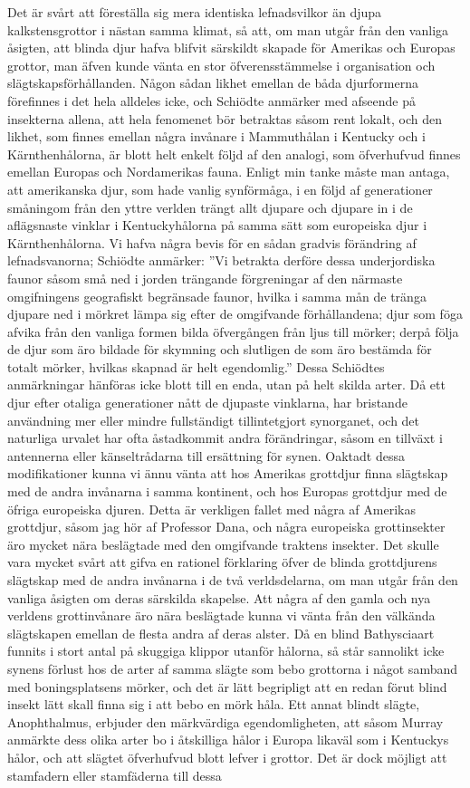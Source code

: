 Det är svårt att föreställa sig mera identiska lefnadsvilkor än djupa kalkstensgrottor i nästan samma klimat, så att, om man utgår från den vanliga åsigten, att blinda djur hafva blifvit särskildt skapade för Amerikas och Europas grottor, man äfven kunde vänta en stor öfverensstämmelse i organisation och slägtskapsförhållanden. Någon sådan likhet emellan de båda djurformerna förefinnes i det hela alldeles icke, och Schiödte anmärker med afseende på insekterna allena, att hela fenomenet bör betraktas såsom rent lokalt, och den likhet, som finnes emellan några invånare i Mammuthålan i Kentucky och i Kärnthenhålorna, är blott helt enkelt följd af den analogi, som öfverhufvud finnes emellan Europas och Nordamerikas fauna. Enligt min tanke måste man antaga, att amerikanska djur, som hade vanlig synförmåga, i en följd af generationer småningom från den yttre verlden trängt allt djupare och djupare in i de aflägsnaste vinklar i Kentuckyhålorna på samma sätt som europeiska djur i Kärnthenhålorna. Vi hafva några bevis för en sådan gradvis förändring af lefnadsvanorna; Schiödte anmärker: ”Vi betrakta derföre dessa underjordiska faunor såsom små ned i jorden trängande förgreningar af den närmaste omgifningens geografiskt begränsade faunor, hvilka i samma mån de tränga djupare ned i mörkret lämpa sig efter de omgifvande förhållandena; djur som föga afvika från den vanliga formen bilda öfvergången från ljus till mörker; derpå följa de djur som äro bildade för skymning och slutligen de som äro bestämda för totalt mörker, hvilkas skapnad är helt egendomlig.” Dessa Schiödtes anmärkningar hänföras icke blott till en enda, utan på helt skilda arter. Då ett djur efter otaliga generationer nått de djupaste vinklarna, har bristande användning mer eller mindre fullständigt tillintetgjort synorganet, och det naturliga urvalet har ofta åstadkommit andra förändringar, såsom en tillväxt i antennerna eller känseltrådarna till ersättning för synen. Oaktadt dessa modifikationer kunna vi ännu vänta att hos Amerikas grottdjur finna slägtskap med de andra invånarna i samma kontinent, och hos Europas grottdjur med de öfriga europeiska djuren. Detta är verkligen fallet med några af Amerikas grottdjur, såsom jag hör af Professor Dana, och några europeiska grottinsekter äro mycket nära beslägtade med den omgifvande traktens insekter. Det skulle vara mycket svårt att gifva en rationel förklaring öfver de blinda grottdjurens slägtskap med de andra invånarna i de två verldsdelarna, om man utgår från den vanliga åsigten om deras särskilda skapelse. Att några af den gamla och nya verldens grottinvånare äro nära beslägtade kunna vi vänta från den välkända slägtskapen emellan de flesta andra af deras alster. Då en blind Bathysciaart funnits i stort antal på skuggiga klippor utanför hålorna, så står sannolikt icke synens förlust hos de arter af samma slägte som bebo grottorna i något samband med boningsplatsens mörker, och det är lätt begripligt att en redan förut blind insekt lätt skall finna sig i att bebo en mörk håla. Ett annat blindt slägte, Anophthalmus, erbjuder den märkvärdiga egendomligheten, att såsom Murray anmärkte dess olika arter bo i åtskilliga hålor i Europa likaväl som i Kentuckys hålor, och att slägtet öfverhufvud blott lefver i grottor. Det är dock möjligt att stamfadern eller stamfäderna till dessa 